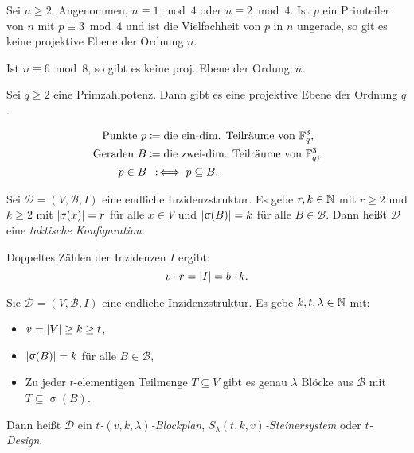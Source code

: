 \documentclass{cheat-sheet}
\newcommand{\F}{\mathbb{F}} %
\newcommand{\Design}{\mathcal{D}} %
\newcommand{\Blocks}{\mathcal{B}} %
\begin{document}
\begin{satz}
  Sei $n \geq 2$.
  Angenommen, $n \equiv 1 \bmod 4$ oder $n \equiv 2 \bmod 4$.
  Ist $p$ ein Primteiler von $n$ mit $p \equiv 3 \bmod 4$ und ist die Vielfachheit von $p$ in $n$ ungerade, so git es keine projektive Ebene der Ordnung $n$.
\end{satz}

\begin{kor}
  Ist $n \equiv 6 \bmod 8$, so gibt es keine proj. Ebene der Ordung~$n$.
\end{kor}

\begin{satz}
  Sei $q \geq 2$ eine Primzahlpotenz.
  Dann gibt es eine projektive Ebene der Ordnung $q$.
\end{satz}

\begin{konstr}\mbox{}
  \vspace{-16pt}
  \begin{align*}
    \text{Punkte } p & \coloneqq \text{die ein-dim. Teilräume von $\F_q^3$,} \\
    \text{Geraden } B & \coloneqq \text{die zwei-dim. Teilräume von $\F_q^3$,} \\
    p \in B & \coloniff p \subseteq B.
  \end{align*}
\end{konstr}

\begin{defn}
  Sei $\Design = (V, \Blocks, I)$ eine endliche Inzidenzstruktur.
  Es gebe $r, k \in \mathbb{N}$ mit $r \geq 2$ und $k \geq 2$ mit $\lvert\sigma(x)\rvert = r$ für alle $x \in V$ und $\lvert\upsigma(B)\rvert = k$ für alle $B \in \Blocks$.
  Dann heißt $\Design$ eine \emph{taktische Konfiguration}.
\end{defn}

\begin{bem}
  Doppeltes Zählen der Inzidenzen $I$ ergibt: \enspace
  \[ v \cdot r = \lvert I\rvert = b \cdot k. \]
\end{bem}

\begin{defn}
  Sie $\Design = (V, \Blocks, I)$ eine endliche Inzidenzstruktur.
  Es gebe $k, t, \lambda \in \mathbb{N}$ mit:
  \begin{itemize}
    \item $v = \lvert V\rvert \geq k \geq t$,
    \item $\lvert\upsigma(B)\rvert = k$ für alle $B \in \Blocks$,
    \item Zu jeder $t$-elementigen Teilmenge $T \subseteq V$ gibt es genau $\lambda$ Blöcke aus $\Blocks$ mit $T \subseteq \upsigma(B)$.
  \end{itemize}
  Dann heißt $\Design$ ein \emph{$t$-$(v, k, \lambda)$-Blockplan}, \emph{$S_\lambda(t, k, v)$-Steinersystem} oder \emph{$t$-Design}.
\end{defn}
\end{document}

